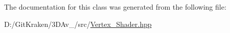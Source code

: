The documentation for this class was generated from the following file\+:\begin{DoxyCompactItemize}
\item 
D\+:/\+Git\+Kraken/3\+D\+Av\+\_/src/\mbox{\hyperlink{_vertex___shader_8hpp}{Vertex\+\_\+\+Shader.\+hpp}}\end{DoxyCompactItemize}
